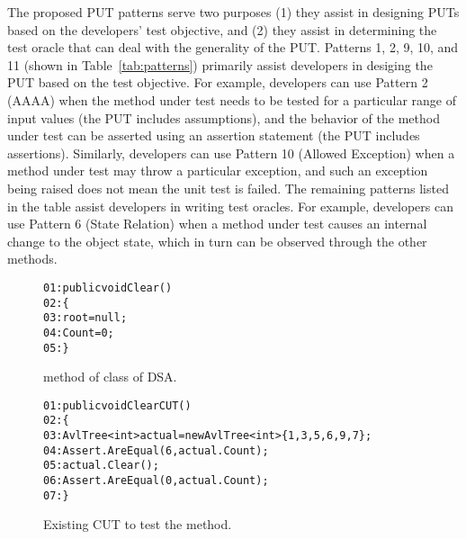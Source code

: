 The proposed PUT patterns serve two purposes (1) they assist in designing PUTs based on the developers' test objective, and (2) they assist in determining the test oracle that can deal with the generality of the PUT. Patterns 1, 2, 9, 10, and 11 (shown in Table~\ref{tab:patterns}) primarily assist developers in desiging the PUT based on the test objective. For example, developers can use Pattern 2 (AAAA) when the method under test needs to be tested for a particular range of input values (the PUT includes assumptions), and the behavior of the method under test can be asserted using an assertion statement (the PUT includes assertions). Similarly, developers can use Pattern 10 (Allowed Exception) when a method under test may throw a particular exception, and such an exception being raised does not mean the unit test is failed. 
The remaining patterns listed in the table assist developers in writing test oracles. For example, developers can use Pattern 6 (State Relation) when a method under test causes an internal change to the object state, which in turn can be observed through the other methods. 

\begin{figure}
\begin{CodeOut}        
\begin{alltt}
01: public void Clear()
02: \{
03: \hspace{0.07in}root = null;
04: \hspace{0.07in}Count = 0;
05: \}
\end{alltt}        
\end{CodeOut}\vspace*{-4ex}
\caption{ method of  class of DSA.}
\label{fig:pattern}%

\begin{CodeOut}        
\begin{alltt}
01: public void ClearCUT()
02: \{
03: \hspace{0.07in}AvlTree<int> actual = new AvlTree<int> \{ 1,3,5,6,9,7 \};
04: \hspace{0.07in}Assert.AreEqual(6, actual.Count);
05: \hspace{0.07in}actual.Clear();
06: \hspace{0.07in}Assert.AreEqual(0, actual.Count);            
07: \}
\end{alltt}
\end{CodeOut}\vspace*{-4ex}
\caption{Existing CUT to test the  method.}%
\label{fig:patternCUT}%
\end{figure}

